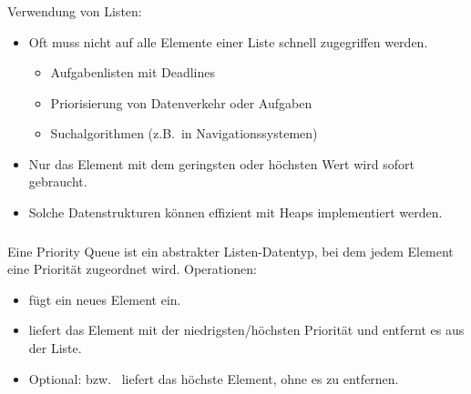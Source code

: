 \begin{frame}
\frametitle{\insertsection}

\begin{block}
{Verwendung von Listen:}
\begin{itemize}
	\item Oft muss nicht auf alle Elemente einer Liste schnell zugegriffen werden.
	\begin{itemize}
		\item Aufgabenlisten mit Deadlines
		\item Priorisierung von Datenverkehr oder Aufgaben
		\item Suchalgorithmen (z.B.\ in Navigationssystemen)
	\end{itemize}
	\item Nur das Element mit dem geringsten oder höchsten Wert wird sofort gebraucht.
	\item Solche Datenstrukturen können effizient mit Heaps implementiert werden.
\end{itemize}
\end{block}
\end{frame}

\begin{frame}
\frametitle{\insertsection}
\begin{definition}
Eine \alert{Priority Queue} ist ein abstrakter Listen-Datentyp, bei dem jedem Element eine Priorität zugeordnet wird.
Operationen:\\
\begin{itemize}
	\item {} fügt ein neues Element ein.
	\item {} liefert das Element mit der niedrigsten/höchsten Priorität und entfernt es aus der Liste.
	\item Optional:  bzw.\  liefert das höchste Element, ohne es zu entfernen.
\end{itemize}
\end{definition}
\end{frame}

